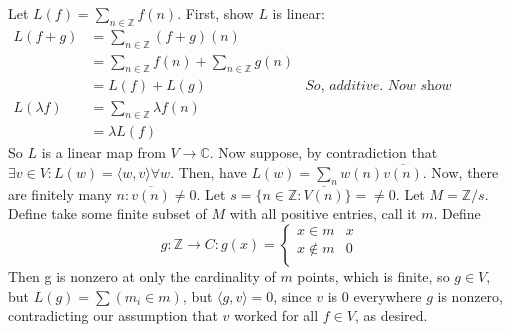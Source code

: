 \documentclass{article}
\begin{document}
Let $L(f) = \sum_{n\in \mathbb{Z}} f(n)$. First, show $L$ is linear:
\begin{align*}
L(f + g) &= \sum_{n \in \mathbb{Z}} (f + g)(n)\\
&= \sum_{n \in \mathbb{Z}} f(n) + \sum_{n \in \mathbb{Z}} g(n)\\
&= L(f) + L(g)
&\textit{So, additive. Now show homogenous:}\\
L(\lambda f) &= \sum_{n \in \mathbb{Z}} \lambda f(n)\\
&= \lambda L(f)
\end{align*}
So $L$ is a linear map from $V \rightarrow \mathbb{C}$. Now suppose, by contradiction that $\exists v \in V: L(w) = \langle w, v \rangle \forall w$. Then, have $L(w) = \sum_{n} w(n) \overline{v(n)}$. Now, there are finitely many $n: \overline{v(n)} \neq 0$. Let $s = \{n\in \mathbb{Z}: \overline{V(n)}\} = \neq 0$. Let $M = \mathbb{Z}/s$. Define take some finite subset of $M$ with all positive entries, call it $m$. Define 
\[ g:\mathbb{Z} \rightarrow C: g(x) = 
\begin{cases} 
 x \in m & x\\ 
 x \notin m & 0\\
 \end{cases} \]
Then g is nonzero at only the cardinality of $m$ points, which is finite, so $g \in V$, but $L(g) = \sum (m_{i} \in m)$, but $\langle g, v \rangle = 0$, since $v$ is 0 everywhere $g$ is nonzero, contradicting our assumption that $v$ worked for all $f \in V$, as desired.
\end{document}
